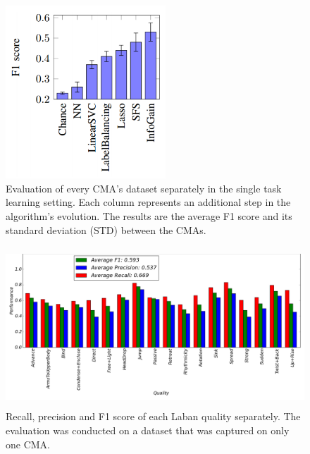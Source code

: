 \documentclass[journal]{journal}
\begin{document}
\begin{figure}[h]
\centering
\includegraphics[width=60mm]{Fig5.png}
\caption{Evaluation of every CMA's dataset separately in the single task learning
		setting. Each column represents an additional step in the algorithm's evolution.
		The results are the average F1 score and its standard deviation (STD) between the CMAs.}
\label{oneCMASummary}
\end{figure}
	


\begin{figure}
	\centering
	\includegraphics[width=\textwidth, height=60mm]{oneCMAFinalWithoutTitle.png}
	\caption{Recall, precision and F1 score of each Laban quality separately. The
	evaluation was conducted on a dataset that was captured on only one CMA.}
	\label{oneCMAFinal}
\end{figure}

%
%
\end{document}
